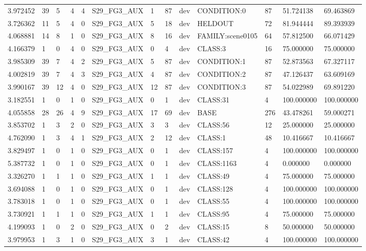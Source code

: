 \begin{tabular}{lllllllllllll}
3.972452 & 39 & 5 & 4 & 4 & S29\_FG3\_AUX & 1 & 87 & dev & CONDITION:0 & 87 & 51.724138 & 69.463869 \\
3.726362 & 11 & 5 & 4 & 0 & S29\_FG3\_AUX & 5 & 18 & dev & HELDOUT & 72 & 81.944444 & 89.393939 \\
4.068881 & 14 & 8 & 1 & 0 & S29\_FG3\_AUX & 8 & 16 & dev & FAMILY:scene0105 & 64 & 57.812500 & 66.071429 \\
4.166379 & 1 & 0 & 4 & 0 & S29\_FG3\_AUX & 0 & 4 & dev & CLASS:3 & 16 & 75.000000 & 75.000000 \\
3.985309 & 39 & 7 & 4 & 2 & S29\_FG3\_AUX & 5 & 87 & dev & CONDITION:1 & 87 & 52.873563 & 67.327117 \\
4.002819 & 39 & 7 & 4 & 3 & S29\_FG3\_AUX & 4 & 87 & dev & CONDITION:2 & 87 & 47.126437 & 63.609169 \\
3.990167 & 39 & 12 & 4 & 0 & S29\_FG3\_AUX & 12 & 87 & dev & CONDITION:3 & 87 & 54.022989 & 69.891220 \\
3.182551 & 1 & 0 & 1 & 0 & S29\_FG3\_AUX & 0 & 1 & dev & CLASS:31 & 4 & 100.000000 & 100.000000 \\
4.055858 & 28 & 26 & 4 & 9 & S29\_FG3\_AUX & 17 & 69 & dev & BASE & 276 & 43.478261 & 59.000271 \\
3.853702 & 1 & 3 & 2 & 0 & S29\_FG3\_AUX & 3 & 3 & dev & CLASS:56 & 12 & 25.000000 & 25.000000 \\
4.762090 & 1 & 3 & 4 & 1 & S29\_FG3\_AUX & 2 & 12 & dev & CLASS:1 & 48 & 10.416667 & 10.416667 \\
3.829497 & 1 & 0 & 1 & 0 & S29\_FG3\_AUX & 0 & 1 & dev & CLASS:157 & 4 & 100.000000 & 100.000000 \\
5.387732 & 1 & 0 & 1 & 0 & S29\_FG3\_AUX & 0 & 1 & dev & CLASS:1163 & 4 & 0.000000 & 0.000000 \\
3.326270 & 1 & 1 & 1 & 0 & S29\_FG3\_AUX & 1 & 1 & dev & CLASS:49 & 4 & 75.000000 & 75.000000 \\
3.694088 & 1 & 0 & 1 & 0 & S29\_FG3\_AUX & 0 & 1 & dev & CLASS:128 & 4 & 100.000000 & 100.000000 \\
3.783018 & 1 & 0 & 1 & 0 & S29\_FG3\_AUX & 0 & 1 & dev & CLASS:55 & 4 & 100.000000 & 100.000000 \\
3.730921 & 1 & 1 & 1 & 0 & S29\_FG3\_AUX & 1 & 1 & dev & CLASS:95 & 4 & 75.000000 & 75.000000 \\
4.199093 & 1 & 0 & 2 & 0 & S29\_FG3\_AUX & 0 & 2 & dev & CLASS:15 & 8 & 50.000000 & 50.000000 \\
3.979953 & 1 & 3 & 1 & 0 & S29\_FG3\_AUX & 3 & 1 & dev & CLASS:42 & 4 & 100.000000 & 100.000000 \\

\end{tabular}

